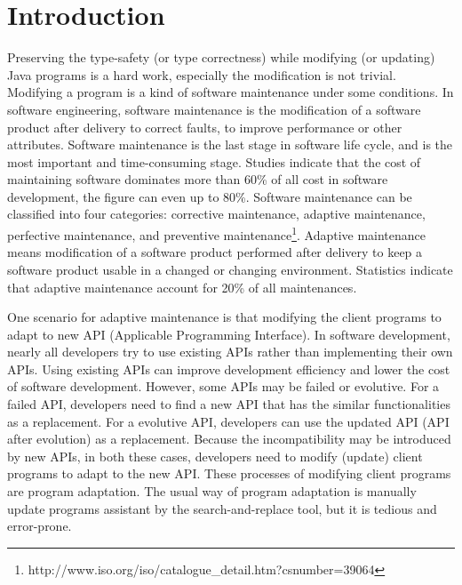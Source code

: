 \section{Introduction}
\label{intro}
Preserving the type-safety (or type correctness) while modifying (or updating) Java programs is a hard work, 
especially the modification is not trivial. 
Modifying a program is a kind of software maintenance under some conditions. 
In software engineering, software maintenance 
is the modification of a software product after delivery to correct faults, to improve performance or 
other attributes. Software maintenance is the last stage in software life cycle, and is the most 
important and time-consuming stage. Studies indicate that the cost of maintaining software dominates 
more than 60\% of all cost in software development, the figure can even up to 80\%\cite{verhoef}. 
Software maintenance can be classified into four categories: corrective maintenance, adaptive maintenance, 
perfective maintenance, and preventive maintenance\footnote{http://www.iso.org/iso/catalogue\_detail.htm?csnumber=39064}. 
Adaptive maintenance means 
modification of a software product performed after delivery to keep a software product usable in a 
changed or changing environment. Statistics indicate that adaptive maintenance 
account for 20\% of all maintenances. 

One scenario for adaptive maintenance is that modifying the client programs to adapt to 
new API (Applicable Programming Interface). In software development, nearly all developers 
try to use existing APIs rather than implementing their own APIs. Using existing APIs can improve 
development efficiency and lower the cost of software development. 
However, some APIs may be failed or evolutive. For a failed API, developers need to 
find a new API that has the similar functionalities as a replacement. 
For a evolutive API, 
developers can use the updated API (API after evolution) as a replacement. 
Because the incompatibility may be introduced by new APIs, in both these cases, 
developers need to modify (update) client programs to adapt to the new 
API. These processes of modifying client programs are program adaptation. 
The usual way of program 
adaptation is manually update programs assistant by the search-and-replace tool, 
but it is tedious and error-prone. 

